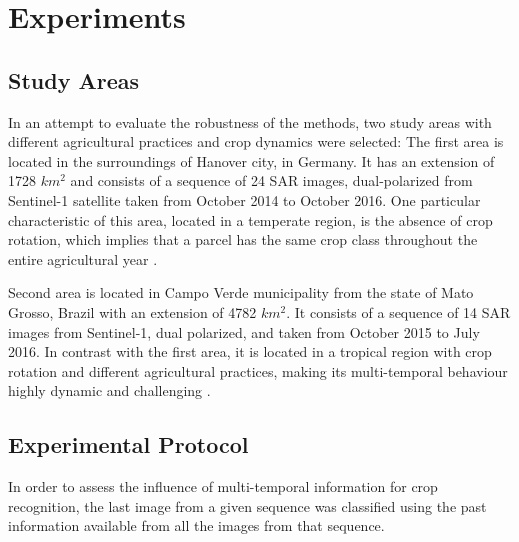\section{Experiments}


\subsection{Study Areas}
In an attempt to evaluate the robustness of the methods, two study areas with different agricultural practices and crop dynamics were selected: The first area is located in the surroundings of Hanover city, in Germany. It has an extension of 1728 $km^2$ and consists of a sequence of 24 SAR images, dual-polarized from Sentinel-1 satellite taken from October 2014 to October 2016. One particular characteristic of this area, located in a temperate region, is the absence of crop rotation, which implies that a parcel has the same crop class throughout the entire agricultural year \cite{bargiel2017new}.

Second area is located in Campo Verde municipality from the state of Mato Grosso, Brazil with an extension of 4782 $km^2$. It consists of a sequence of 14 SAR images from Sentinel-1, dual polarized, and taken from October 2015 to July 2016. In contrast with the first area, it is located in a tropical region with crop rotation and different agricultural practices, making its multi-temporal behaviour highly dynamic and challenging \cite{sanches2018campo}.

\subsection{Experimental Protocol}
In order to assess the influence of multi-temporal information for crop recognition, the last image from a given sequence was classified using the past information available from all the images from that sequence.

